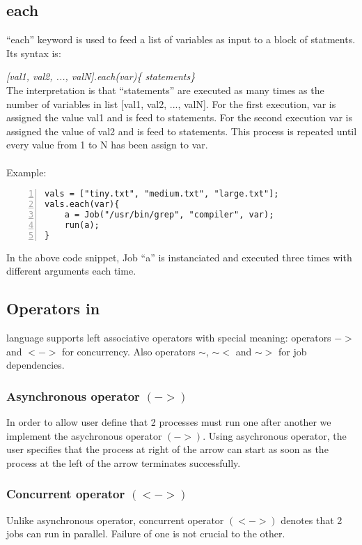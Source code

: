 \subsection*{each}

\noindent ``each'' keyword is used to feed a list of variables as input
to a block of statments. Its syntax is:

\textit{[val1, val2, ..., valN].each(var)\{ statements\}}\\

The interpretation is that ``statements'' are executed as many times as the
number of variables in list [val1, val2, ..., valN]. For the first execution, var is assigned
the value val1 and is feed to statements. For the second execution var is assigned the value
of val2 and is feed to statements. This process is repeated until every value 
from 1 to N has been assign to var.\\
\\
Example:
\begin{Verbatim}[numbers=left]
vals = ["tiny.txt", "medium.txt", "large.txt"];
vals.each(var){
    a = Job("/usr/bin/grep", "compiler", var);
    run(a);
}
\end{Verbatim}

In the above code snippet, Job ``a'' is instanciated and executed three times
with different arguments each time.



\subsection*{Operators in \lang{}}

\lang{} language supports left associative operators with special meaning: operators $->$ and $<->$ for concurrency. 
Also operators $\sim$, $\sim<$ and $\sim>$ for job dependencies.
\subsubsection*{Asynchronous operator $(->)$}
In order to allow user define that 2 processes must run one after another
we implement the asychronous operator $(->)$. Using asychronous operator, the user
specifies that the process at right of the arrow can start as soon as
the process at the left of the arrow terminates successfully.
\subsubsection*{Concurrent operator $(<->)$}
Unlike asynchronous operator, concurrent operator $(<->)$ denotes that 2 jobs can
run in parallel. Failure of one is not crucial to the other.
